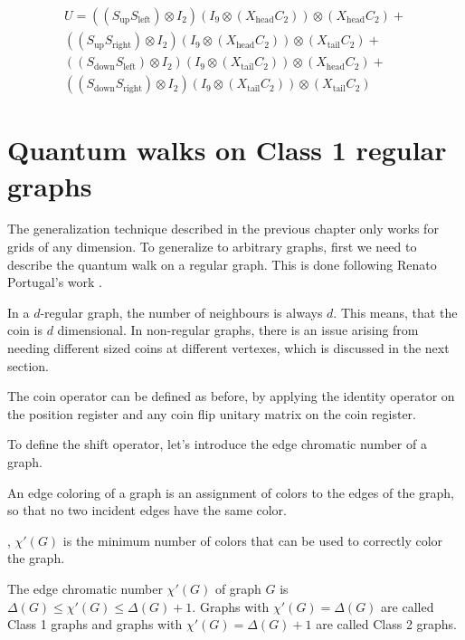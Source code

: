 \begin{align}
   U =
   ((S_{\text{up}}  S_{\text{left}}) \otimes I_2) (I_9 \otimes (X_{\text{head}}C_2)) \otimes (X_{\text{head}}C_2) + \\
   ((S_{\text{up}}  S_{\text{right}}) \otimes I_2) (I_9 \otimes (X_{\text{head}}C_2)) \otimes (X_{\text{tail}}C_2) + \\
   ((S_{\text{down}}  S_{\text{left}}) \otimes I_2) (I_9 \otimes (X_{\text{tail}}C_2)) \otimes (X_{\text{head}}C_2) + \\
   ((S_{\text{down}}  S_{\text{right}}) \otimes I_2) (I_9 \otimes (X_{\text{tail}}C_2)) \otimes (X_{\text{tail}}C_2)
\end{align}

\section{Quantum walks on Class 1 regular graphs}

The generalization technique described in the previous chapter only works for grids of any dimension. To generalize to arbitrary graphs, first we need to describe the quantum walk on a regular graph. This is done following Renato Portugal's work \cite{Portugal}.

In a $d$-regular graph, the number of neighbours is always $d$. This means, that the coin is $d$ dimensional. In non-regular graphs, there is an issue arising from needing different sized coins at different vertexes, which is discussed in the next section.

The coin operator can be defined as before, by applying the identity operator on the position register and any coin flip unitary matrix on the coin register.

To define the shift operator, let's introduce the edge chromatic number of a graph.



An edge coloring of a graph is an assignment of colors to the edges of the graph, so that no two incident edges have the same color.

, $\chi'(G)$ is the minimum number of colors that can be used to correctly color the graph.


The edge chromatic number $\chi'(G)$ of graph $G$ is $\Delta(G) \leq{} \chi'(G) \leq{} \Delta(G)+1$. Graphs with $\chi'(G) = \Delta(G)$ are called Class 1 graphs and graphs with $\chi'(G) = \Delta(G)+1$ are called Class 2 graphs.

